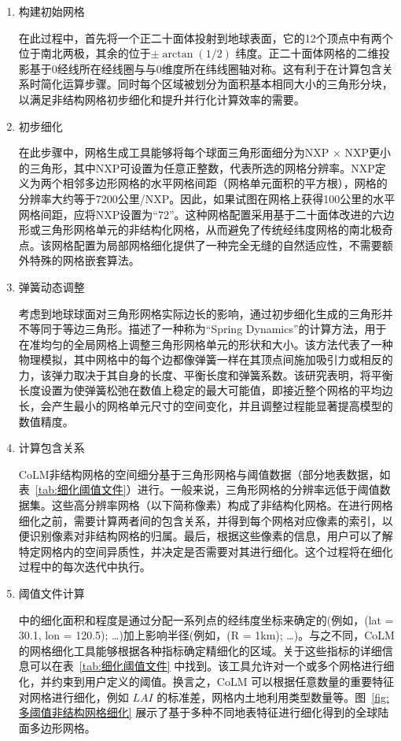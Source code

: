 \begin{enumerate}
\item 构建初始网格

在此过程中，首先将一个正二十面体投射到地球表面，它的12个顶点中有两个位于南北两极，其余的位于$\pm\arctan(1/2)$ 纬度。正二十面体网格的二维投影基于0\textdegree 经线所在经线圈与与0\textdegree 维度所在纬线圈轴对称。这有利于在计算包含关系时简化运算步骤。同时每个区域被划分为面积基本相同大小的三角形分块，以满足非结构网格初步细化和提升并行化计算效率的需要。

\item 初步细化

在此步骤中，网格生成工具能够将每个球面三角形面细分为NXP $\times$ NXP更小的三角形，其中NXP可设置为任意正整数，代表所选的网格分辨率。NXP定义为两个相邻多边形网格的水平网格间距（网格单元面积的平方根），网格的分辨率大约等于7200公里/NXP。因此，如果试图在网格上获得100公里的水平网格间距，应将NXP设置为“72”。这种网格配置采用基于二十面体改进的六边形或三角形网格单元的非结构化网格，从而避免了传统经纬度网格的南北极奇点。该网格配置为局部网格细化提供了一种完全无缝的自然适应性，不需要额外特殊的网格嵌套算法。

\item 弹簧动态调整

考虑到地球球面对三角形网格实际边长的影响，通过初步细化生成的三角形并不等同于等边三角形。\citet{tomita2002optimization}描述了一种称为“Spring Dynamics”的计算方法，用于在准均匀的全局网格上调整三角形网格单元的形状和大小。该方法代表了一种物理模拟，其中网格中的每个边都像弹簧一样在其顶点间施加吸引力或相反的力，该弹力取决于其自身的长度、平衡长度和弹簧系数。该研究表明，将平衡长度设置为使弹簧松弛在数值上稳定的最大可能值，即接近整个网格的平均边长，会产生最小的网格单元尺寸的空间变化，并且调整过程能显著提高模型的数值精度。

\item 计算包含关系

CoLM非结构网格的空间细分基于三角形网格与阈值数据（部分地表数据，如表~\ref{tab:细化阈值文件}）进行。一般来说，三角形网格的分辨率远低于阈值数据集。这些高分辨率网格（以下简称像素）构成了非结构化网格。在进行网格细化之前，需要计算两者间的包含关系，并得到每个网格对应像素的索引，以便识别像素对非结构网格的归属。最后，根据这些像素的信息，用户可以了解特定网格内的空间异质性，并决定是否需要对其进行细化。这个过程将在细化过程中的每次迭代中执行。

\item 阈值文件计算


\citet{walko_direct_2011} 中的细化面积和程度是通过分配一系列点的经纬度坐标来确定的(例如，(lat = 30.1, lon = 120.5); \dots)加上影响半径(例如，(R = 1km); \dots)。与之不同，CoLM的网格细化工具能够根据各种指标确定精细化的区域。关于这些指标的详细信息可以在表~\ref{tab:细化阈值文件} 中找到。该工具允许对一个或多个网格进行细化，并约束到用户定义的阈值。换言之，CoLM 可以根据任意数量的重要特征对网格进行细化，例如 $LAI$ 的标准差，网格内土地利用类型数量等。图~\ref{fig:多阈值非结构网格细化} 展示了基于多种不同地表特征进行细化得到的全球陆面多边形网格。


\end{enumerate}

